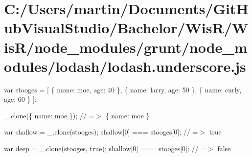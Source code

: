 \hypertarget{_c_1_2_users_2martin_2_documents_2_git_hub_visual_studio_2_bachelor_2_wis_r_2_wis_r_2node_module90297fde802c62ef18cb50832c7aa71e}{}\section{C\+:/\+Users/martin/\+Documents/\+Git\+Hub\+Visual\+Studio/\+Bachelor/\+Wis\+R/\+Wis\+R/node\+\_\+modules/grunt/node\+\_\+modules/lodash/lodash.\+underscore.\+js}
var stooges = \mbox{[} \{ \textquotesingle{}name\textquotesingle{}\+: \textquotesingle{}moe\textquotesingle{}, \textquotesingle{}age\textquotesingle{}\+: 40 \}, \{ \textquotesingle{}name\textquotesingle{}\+: \textquotesingle{}larry\textquotesingle{}, \textquotesingle{}age\textquotesingle{}\+: 50 \}, \{ \textquotesingle{}name\textquotesingle{}\+: \textquotesingle{}curly\textquotesingle{}, \textquotesingle{}age\textquotesingle{}\+: 60 \} \mbox{]};

\+\_\+.\+clone(\{ \textquotesingle{}name\textquotesingle{}\+: \textquotesingle{}moe\textquotesingle{} \}); // =$>$ \{ \textquotesingle{}name\textquotesingle{}\+: \textquotesingle{}moe\textquotesingle{} \}

var shallow = \+\_\+.\+clone(stooges); shallow\mbox{[}0\mbox{]} === stooges\mbox{[}0\mbox{]}; // =$>$ true

var deep = \+\_\+.\+clone(stooges, true); shallow\mbox{[}0\mbox{]} === stooges\mbox{[}0\mbox{]}; // =$>$ false



